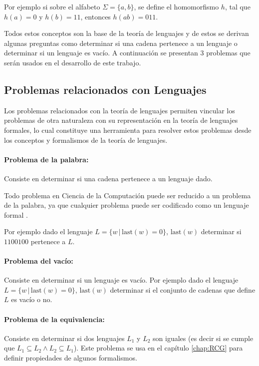 \documentclass[12pt]{article}
\begin{document}
Por ejemplo si sobre el alfabeto $\Sigma=\{a,b\}$, se define el homomorfismo $h$, tal que $h(a)=0$ y $h(b)=11$, entonces
$h(ab)=011$.

Todos estos conceptos son la base de la teoría de lenguajes y de estos se derivan algunas 
preguntas como determinar si una cadena pertenece a un lenguaje o determinar si un lenguaje es vacío. A continuación se presentan 3 problemas que serán usados en el desarrollo de este trabajo.

\subsection{Problemas relacionados con Lenguajes}

Los problemas relacionados con la teoría de lenguajes permiten vincular los problemas de otra naturaleza 
con su representación en la teoría de lenguajes formales, lo cual constituye una herramienta para resolver
estos problemas desde los conceptos y formalismos de la teoría de lenguajes.

\paragraph{Problema de la palabra:} Consiste en determinar si una cadena pertenece a un lenguaje dado.

Todo problema en Ciencia de la Computación puede ser reducido a un problema de la palabra, ya que cualquier problema
puede ser codificado como un lenguaje formal \cite{authomataTheory}. 

Por ejemplo dado el lenguaje $L=\{w\,|\,\text{last}(w)=0\}$, $\text{last}(w)$ determinar si $1100100$ pertenece a $L$.

\paragraph{Problema del vacío:} Consiste en determinar si un lenguaje es vacío. Por ejemplo dado el lenguaje
$L=\{w\,|\,\text{last}(w)=0\}$, $\text{last}(w)$ determinar si el conjunto de cadenas que define $L$ es vacío o no.

\paragraph{Problema de la equivalencia:} Consiste en determinar si dos lenguajes $L_1$ y $L_2$ son iguales (es decir si se cumple que
$L_1\subseteq L_2 \wedge L_2\subseteq L_1$). Este problema se usa en el capítulo \ref{chap:RCG} para definir propiedades de algunos formalismos.
\end{document}
